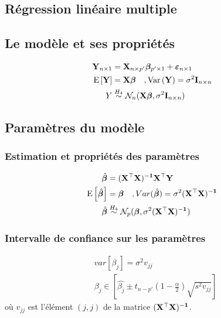 \documentclass[10pt, french]{article}
\begin{document}
\begin{multicols*}{3}
\section{Régression linéaire multiple}
\subsection*{Le modèle et ses propriétés}
\begin{align*}
\mathbf{Y}_{n \times 1} & = \mathbf{X}_{n \times p'} \bm{\beta}_{p' \times 1} + \bm{\varepsilon}_{n \times 1} \\
\mathrm{E} \left[ \mathbf{Y} \right]	& = \mathbf{X} \bm{\beta} \quad , \mathrm{Var} \left( \mathbf{Y} \right) = \sigma^2 \mathbf{I}_{n \times n} \\
Y & \overset{H_4}{\sim} \mathcal{N}_n(\mathbf{X} \bm{\beta}, \sigma^2 \mathbf{I}_{n \times n}) \\
\end{align*}

\subsection*{Paramètres du modèle}
\subsubsection*{Estimation et propriétés des paramètres}
\begin{align*}
\hat{\bm{\beta}} & = \mathbf{(X^\top X)^{-1} X^\top Y} \\
\mathrm{E} \left[ \hat{\bm{\beta}} \right]	& = \bm{\beta} \quad , Var(\hat{\bm{\beta}}) = \sigma^2 (\mathbf{X^\top X)^{-1}} \\
\hat{\bm{\beta}} & \overset{H_4}{\sim} \mathcal{N}_p(\bm{\beta}, \sigma^2 (\mathbf{X^\top X)^{-1}})
\end{align*}

\subsubsection*{Intervalle de confiance sur les paramètres}
\begin{align*}
&var[\beta_j] = \sigma^2 v_{jj} \\
&\beta_j \in \left[ \hat{\beta_j} \pm t_{n-p'} \left(1- \frac{\alpha}{2} \right) \sqrt{s^2 v_{jj}} \right]
\end{align*}
où $v_{jj}$ est l'élément $(j,j)$ de la matrice $\mathbf{(X^\top X)^{-1}}$.


\end{multicols*}
\end{document}
